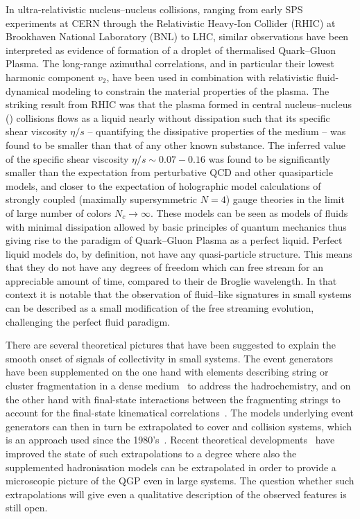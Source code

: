 \documentclass[../report.tex]{subfiles}
\begin{document}
In ultra-relativistic nucleus--nucleus collisions, ranging from early SPS experiments at CERN through the Relativistic Heavy-Ion Collider (RHIC) at Brookhaven National Laboratory (BNL) to LHC, similar observations have been interpreted as evidence of formation of a droplet of thermalised Quark--Gluon Plasma. The long-range azimuthal correlations, and in particular their lowest harmonic component $v_2$, have been used in combination with relativistic fluid-dynamical modeling to constrain the material properties of the plasma.  The striking result from RHIC was that the plasma formed in central nucleus--nucleus (\AOnA) collisions flows as a liquid nearly without dissipation such that its specific shear viscosity $\eta/s$ -- quantifying the dissipative properties of the medium -- was found to be smaller than that of any other known substance. The inferred value of the specific shear viscosity $\eta/s\sim 0.07-0.16$ was found to be significantly smaller than the expectation from perturbative QCD and other quasiparticle models, and closer to the expectation of holographic model calculations of strongly coupled (maximally supersymmetric $N=4$) gauge theories in the limit of large number of colors $N_c \rightarrow \infty$. These models can be seen as models of fluids with minimal dissipation allowed by basic principles of quantum mechanics thus giving rise to the paradigm of Quark--Gluon Plasma as a perfect liquid. Perfect liquid models do, by definition, not have any quasi-particle structure. This means that they do not have any degrees of freedom which can free stream for an appreciable amount of time, compared to their de Broglie wavelength. In that context it is notable that the observation of fluid--like signatures in small systems can be described as a small modification of the free streaming evolution, challenging the perfect fluid paradigm.

There are several theoretical pictures that have been suggested to explain the smooth onset of signals of collectivity in small systems. The \pp event generators have been supplemented on the one hand with elements describing string or cluster fragmentation in a dense medium~\cite{Bierlich:2014xba,Gieseke:2017clv} to address the hadrochemistry, and on the other hand with final-state interactions between the fragmenting strings to account for the final-state kinematical correlations~\cite{Bierlich:2017vhg}. The models underlying \pp event generators can then in turn be extrapolated to cover \pPb and \PbPb collision systems, which is an approach used since the 1980's~\cite{Andersson:1986gw,Wang:1991hta}. Recent theoretical developments~\cite{Bierlich:2018xfw,Bellm:2018sjt} have improved the state of such extrapolations to a degree where also the supplemented hadronisation models can be extrapolated in order to provide a microscopic picture of the QGP even in large systems. The question whether such extrapolations will give even a qualitative description of the observed features is still open.
\end{document}
